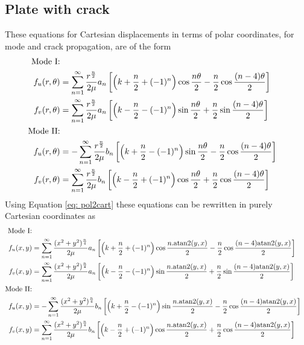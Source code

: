 \documentclass[12pt,oneside,openany,a4paper, %
english, %
masters-t, goldenblock]{usthesis}
\newcommand{\RomanNumeralCaps}[1]
    {\MakeUppercase{\romannumeral #1}}
\begin{document}
\begin{appendices}
\section{Plate with crack}
\label{ap: plate crack}
These equations for Cartesian displacements in terms of polar coordinates, for mode \RomanNumeralCaps{1} and \RomanNumeralCaps{2} crack propagation, are of the form \cite{yates2009quantifying}
\begin{align}
  \text{Mode \RomanNumeralCaps{1}:} \nonumber \\
  f_u(r,\theta) &= \sum_{n=1}^{\infty} \frac{r^\frac{n}{2}}{2 \mu} a_n \left[ \left( k+\frac{n}{2} + (-1)^n \right) \cos{\frac{n \theta}{2}} - \frac{n}{2} \cos{\frac{(n-4)\theta}{2}} \right] \\
  f_v(r,\theta) &= \sum_{n=1}^{\infty} \frac{r^\frac{n}{2}}{2 \mu} a_n \left[ \left( k-\frac{n}{2} - (-1)^n \right) \sin{\frac{n \theta}{2}} + \frac{n}{2} \sin{\frac{(n-4)\theta}{2}} \right]\\
  \text{Mode \RomanNumeralCaps{2}:} \nonumber \\
  f_u(r,\theta) &= -\sum_{n=1}^{\infty} \frac{r^\frac{n}{2}}{2 \mu} b_n \left[ \left( k+\frac{n}{2} - (-1)^n \right) \sin{\frac{n \theta}{2}} - \frac{n}{2} \cos{\frac{(n-4)\theta}{2}} \right] \\
  f_v(r,\theta) &= \sum_{n=1}^{\infty} \frac{r^\frac{n}{2}}{2 \mu} b_n \left[ \left( k-\frac{n}{2} + (-1)^n \right) \cos{\frac{n \theta}{2}} + \frac{n}{2} \cos{\frac{(n-4)\theta}{2}} \right]
\end{align}
Using Equation \ref{eq: pol2cart} these equations can be rewritten in purely Cartesian coordinates as
\begin{align}
  \text{Mode \RomanNumeralCaps{1}:} \nonumber \\
  f_u(x,y) &= \sum_{n=1}^{\infty} \frac{(x^2+y^2)^\frac{n}{4}}{2 \mu} a_n \left[ \left( k+\frac{n}{2} + (-1)^n \right) \cos{\frac{n .\text{atan2} (y,x)}{2}} - \frac{n}{2} \cos{\frac{(n-4)\text{atan2} (y,x)}{2}} \right] \\
  f_v(x,y) &= \sum_{n=1}^{\infty} \frac{(x^2+y^2)^\frac{n}{4}}{2 \mu} a_n \left[ \left( k-\frac{n}{2} - (-1)^n \right) \sin{\frac{n .\text{atan2} (y,x)}{2}} + \frac{n}{2} \sin{\frac{(n-4)\text{atan2} (y,x)}{2}} \right]\\
  \text{Mode \RomanNumeralCaps{2}:} \nonumber \\
  f_u(x,y) &= -\sum_{n=1}^{\infty} \frac{(x^2+y^2)^\frac{n}{4}}{2 \mu} b_n \left[ \left( k+\frac{n}{2} - (-1)^n \right) \sin{\frac{n .\text{atan2} (y,x)}{2}} - \frac{n}{2} \cos{\frac{(n-4)\text{atan2} (y,x)}{2}} \right] \\
  f_v(x,y) &= \sum_{n=1}^{\infty} \frac{(x^2+y^2)^\frac{n}{4}}{2 \mu} b_n \left[ \left( k-\frac{n}{2} + (-1)^n \right) \cos{\frac{n .\text{atan2} (y,x)}{2}} + \frac{n}{2} \cos{\frac{(n-4)\text{atan2} (y,x)}{2}} \right]
\end{align}

\end{appendices}
\end{document}
